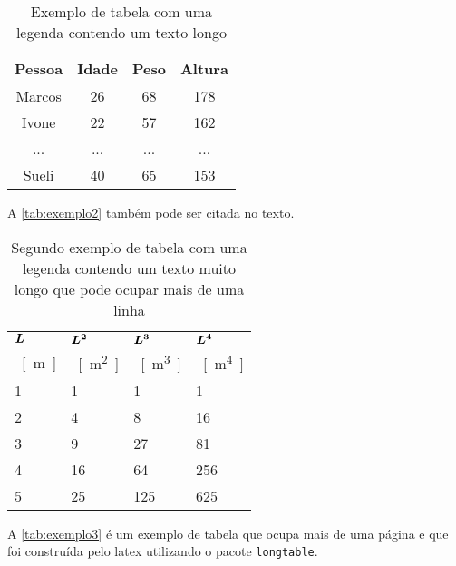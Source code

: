 \begin{table}[htb]
  \captionsetup{width=0.33\textwidth}
  \centering
  \caption{\label{tab:exemplo1}Exemplo de tabela com uma legenda contendo um texto longo}
  \begin{tabular}{cccc}
    \hline
    \textbf{Pessoa} & \textbf{Idade} & \textbf{Peso} & \textbf{Altura} \\ \hline
    Marcos          & 26             & 68            & 178             \\
    Ivone           & 22             & 57            & 162             \\
    ...             & ...            & ...           & ...             \\
    Sueli           & 40             & 65            & 153             \\ \hline
  \end{tabular}
  \fonte{}
\end{table}

A \autoref{tab:exemplo2} também pode ser citada no texto.

\begin{table}[htb]%
  \caption{Segundo exemplo de tabela com uma legenda contendo um texto muito longo que pode ocupar mais de uma linha}%
  \label{tab:exemplo2}%
  \begin{tabularx}{\textwidth}{@{\extracolsep{\fill}}llll}%
    \toprule
    $\boldsymbol{L}$ & $\boldsymbol{L^2}$ & $\boldsymbol{L^3}$ & $\boldsymbol{L^4}$ \\
    \SI{}{[m]} & \SI{}{[m^2]} & \SI{}{[m^3]} & \SI{}{[m^4]} \\ \midrule
    1          & 1            & 1            & 1            \\
    2          & 4            & 8            & 16           \\
    3          & 9            & 27           & 81           \\
    4          & 16           & 64           & 256          \\
    5          & 25           & 125          & 625          \\ \bottomrule
  \end{tabularx}
  \fonte{}%
\end{table}

A \autoref{tab:exemplo3} é um exemplo de tabela que ocupa mais de uma página e que foi construída pelo \gls{latex} utilizando o pacote \texttt{longtable}.

